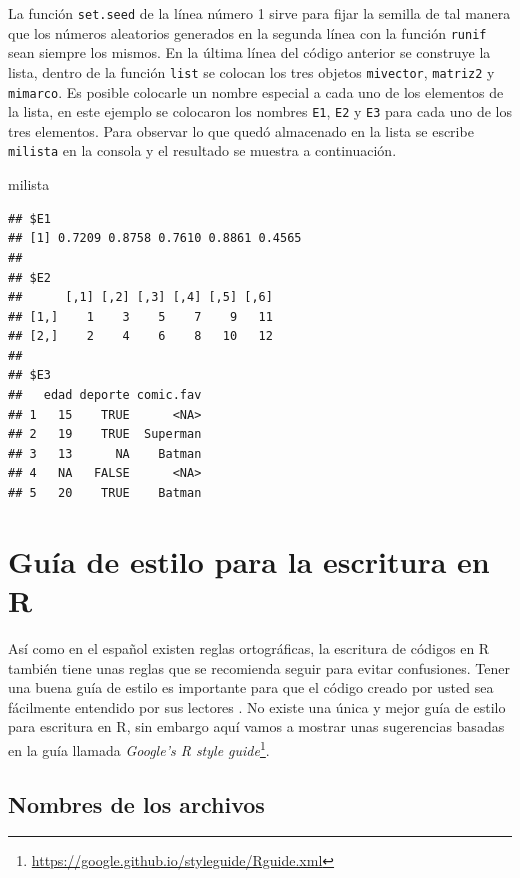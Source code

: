 \documentclass[10pt,]{krantz}
\makeatletter
\newenvironment{Shaded}{\begin{snugshade}}{\end{snugshade}}
\newcommand{\NormalTok}[1]{#1}
\let\proglang=\textsf
\renewcommand{\href}[2]{#2\footnote{\url{#1}}}
\newenvironment{kframe}{%
\medskip{}
\setlength{\fboxsep}{.8em}
 \def\at@end@of@kframe{}%
 \ifinner\ifhmode%
  \def\at@end@of@kframe{\end{minipage}}%
  \begin{minipage}{\columnwidth}%
 \fi\fi%
 \def\FrameCommand##1{\hskip\@totalleftmargin \hskip-\fboxsep
 \colorbox{shadecolor}{##1}\hskip-\fboxsep
     \hskip-\linewidth \hskip-\@totalleftmargin \hskip\columnwidth}%
 \MakeFramed {\advance\hsize-\width
   \@totalleftmargin\z@ \linewidth\hsize
   \@setminipage}}%
 {\par\unskip\endMakeFramed%
 \at@end@of@kframe}
\renewenvironment{Shaded}{\begin{kframe}}{\end{kframe}}
\makeatother
\begin{document}
La función \texttt{set.seed} de la línea número 1 sirve para fijar la
semilla de tal manera que los números aleatorios generados en la segunda
línea con la función \texttt{runif} sean siempre los mismos. En la
última línea del código anterior se construye la lista, dentro de la
función \texttt{list} se colocan los tres objetos \texttt{mivector},
\texttt{matriz2} y \texttt{mimarco}. Es posible colocarle un nombre
especial a cada uno de los elementos de la lista, en este ejemplo se
colocaron los nombres \texttt{E1}, \texttt{E2} y \texttt{E3} para cada
uno de los tres elementos. Para observar lo que quedó almacenado en la
lista se escribe \texttt{milista} en la consola y el resultado se
muestra a continuación.

\begin{Shaded}
\begin{Highlighting}[]
\NormalTok{milista}
\end{Highlighting}
\end{Shaded}

\begin{verbatim}
## $E1
## [1] 0.7209 0.8758 0.7610 0.8861 0.4565
## 
## $E2
##      [,1] [,2] [,3] [,4] [,5] [,6]
## [1,]    1    3    5    7    9   11
## [2,]    2    4    6    8   10   12
## 
## $E3
##   edad deporte comic.fav
## 1   15    TRUE      <NA>
## 2   19    TRUE  Superman
## 3   13      NA    Batman
## 4   NA   FALSE      <NA>
## 5   20    TRUE    Batman
\end{verbatim}

\section{Guía de estilo para la escritura en R} \label{sec:estilo}

Así como en el español existen reglas ortográficas, la escritura de
códigos en \proglang{R} también tiene unas reglas que se recomienda
seguir para evitar confusiones. Tener una buena guía de estilo
 es importante para que el código creado por usted
sea fácilmente entendido por sus lectores \citet{rpackages}. No existe
una única y mejor guía de estilo para escritura en \proglang{R}, sin
embargo aquí vamos a mostrar unas sugerencias basadas en la guía llamada
\href{https://google.github.io/styleguide/Rguide.xml}{\textit{Google's R style guide}}.

\subsection{Nombres de los archivos}
\end{document}
